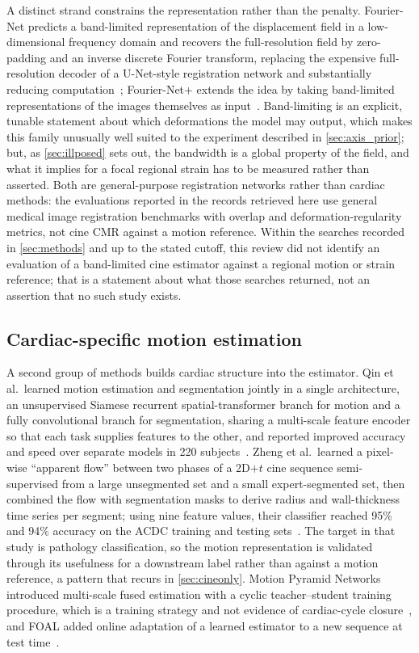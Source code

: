 A distinct strand constrains the representation rather than the penalty. Fourier-Net predicts a
band-limited representation of the displacement field in a low-dimensional frequency domain and
recovers the full-resolution field by zero-padding and an inverse discrete Fourier transform,
replacing the expensive full-resolution decoder of a U-Net-style registration network and
substantially reducing computation~\citep{jia2023fouriernet}; Fourier-Net+ extends the idea by
taking band-limited representations of the images themselves as input~\citep{jia2026fouriernetplus}.
Band-limiting is an explicit, tunable statement about which deformations the model may output, which
makes this family unusually well suited to the experiment described in \cref{sec:axis_prior};
but, as \cref{sec:illposed} sets out, the bandwidth is a global property of the field, and what it
implies for a focal regional strain has to be measured rather than asserted. Both are general-purpose registration
networks rather than cardiac methods: the evaluations reported in the records retrieved here use
general medical image registration benchmarks with overlap and deformation-regularity metrics, not
cine CMR against a motion reference. Within the searches recorded in \cref{sec:methods} and up to
the stated cutoff, this review did not identify an evaluation of a band-limited cine estimator against a
regional motion or strain reference; that is a statement about what those searches returned, not an
assertion that no such study exists.

\subsection{Cardiac-specific motion estimation}\label{sec:cardiacspecific}

A second group of methods builds cardiac structure into the estimator. Qin et al.\ learned motion
estimation and segmentation jointly in a single architecture, an unsupervised Siamese recurrent
spatial-transformer branch for motion and a fully convolutional branch for segmentation, sharing a
multi-scale feature encoder so that each task supplies features to the other, and reported
improved accuracy and speed over separate models in 220 subjects~\citep{qin2018joint}. Zheng et al.\ learned a pixel-wise
\enquote{apparent flow} between two phases of a 2D$+t$ cine sequence semi-supervised from a large
unsegmented set and a small expert-segmented set, then combined the flow with segmentation masks to
derive radius and wall-thickness time series per segment; using nine feature values, their
classifier reached 95\% and 94\% accuracy on the ACDC training and testing
sets~\citep{zheng2019apparent}. The target in that study is pathology classification, so the motion
representation is validated through its usefulness for a downstream label rather than against a
motion reference, a pattern that recurs in \cref{sec:cineonly}. Motion Pyramid Networks introduced
multi-scale fused estimation with a cyclic teacher--student training procedure, which is a training
strategy and not evidence of cardiac-cycle closure~\citep{yu2020mpn}, and FOAL added online
adaptation of a learned estimator to a new sequence at test time~\citep{yu2020foal}.


